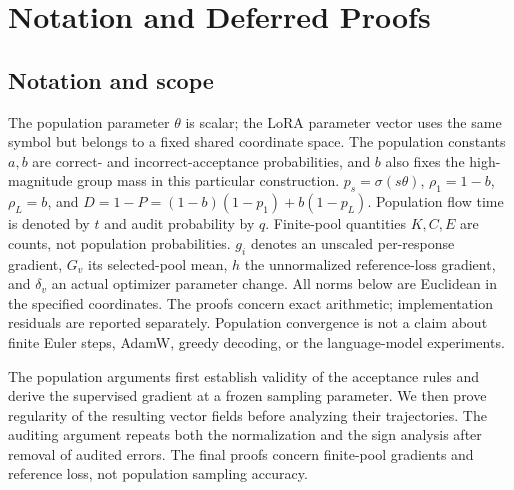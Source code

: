 \section{Notation and Deferred Proofs}
\label{app:proof}

\subsection{Notation and scope}
The population parameter $\theta$ is scalar; the LoRA parameter vector uses
the same symbol but belongs to a fixed shared coordinate space. The population
constants $a,b$ are correct- and incorrect-acceptance probabilities, and $b$
also fixes the high-magnitude group mass in this particular construction.
$p_s=\sigma(s\theta)$, $\rho_1=1-b$, $\rho_L=b$, and
$D=1-P=(1-b)(1-p_1)+b(1-p_L)$.
Population flow time is denoted by $t$ and audit probability by $q$.
Finite-pool quantities $K,C,E$ are counts, not population probabilities.
$g_i$ denotes an unscaled per-response gradient, $G_v$ its selected-pool mean,
$h$ the unnormalized reference-loss gradient, and $\delta_v$ an actual
optimizer parameter change. All norms below are Euclidean in the specified
coordinates. The proofs concern exact arithmetic; implementation residuals
are reported separately. Population convergence is not a claim about finite
Euler steps, AdamW, greedy decoding, or the language-model experiments.

The population arguments first establish validity of the acceptance rules
and derive the supervised gradient at a frozen sampling parameter. We then
prove regularity of the resulting vector fields before analyzing their
trajectories. The auditing argument repeats both the normalization and the
sign analysis after removal of audited errors. The final proofs concern
finite-pool gradients and reference loss, not population sampling accuracy.

